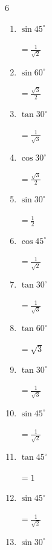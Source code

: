 \begin{multicols}{6}
\begin{enumerate}
  \item $\displaystyle \sin{45^\circ}$

        $\displaystyle =\frac{1}{\sqrt{2}}$

  \item $\displaystyle \sin{60^\circ}$

        $\displaystyle =\frac{\sqrt{3}}{2}$

  \item $\displaystyle \tan{30^\circ}$

        $\displaystyle =\frac{1}{\sqrt{3}}$

  \item $\displaystyle \cos{30^\circ}$

        $\displaystyle =\frac{\sqrt{3}}{2}$

  \item $\displaystyle \sin{30^\circ}$

        $\displaystyle =\frac{1}{2}$

  \item $\displaystyle \cos{45^\circ}$

        $\displaystyle =\frac{1}{\sqrt{2}}$

  \item $\displaystyle \tan{30^\circ}$

        $\displaystyle =\frac{1}{\sqrt{3}}$

  \item $\displaystyle \tan{60^\circ}$

        $\displaystyle =\sqrt{3}$

\columnbreak %

  \item $\displaystyle \tan{30^\circ}$

        $\displaystyle =\frac{1}{\sqrt{3}}$

  \item $\displaystyle \sin{45^\circ}$

        $\displaystyle =\frac{1}{\sqrt{2}}$

  \item $\displaystyle \tan{45^\circ}$

        $\displaystyle =1$

  \item $\displaystyle \sin{45^\circ}$

        $\displaystyle =\frac{1}{\sqrt{2}}$

  \item $\displaystyle \sin{30^\circ}$


\end{enumerate}
\end{multicols}

